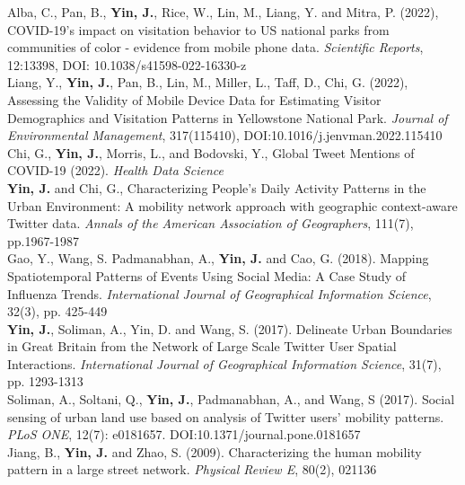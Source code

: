 \documentclass[11pt, a4paper]{article}
\newcommand{\years}[1]{\marginnote{\scriptsize #1}}
\begin{document}
\years{2022}Alba, C., Pan, B., \textbf{Yin, J.},  Rice, W., Lin, M.,  Liang, Y. and Mitra, P. (2022), COVID-19's impact on visitation behavior to US national parks from communities of color - evidence from mobile phone data. \textit{Scientific Reports}, 12:13398, DOI: 10.1038/s41598-022-16330-z\\
\years{2022}Liang, Y., \textbf{Yin, J.},  Pan, B.,  Lin, M., Miller, L., Taff, D., Chi, G. (2022), Assessing the Validity of Mobile Device Data for Estimating Visitor Demographics and Visitation Patterns in Yellowstone National Park. \textit{Journal of Environmental Management}, 317(115410), DOI:10.1016/j.jenvman.2022.115410\\
\years{2022}Chi, G., \textbf{Yin, J.}, Morris, L., and Bodovski, Y., Global Tweet Mentions of COVID-19 (2022). \textit{Health Data Science}\\
\years{2021}\textbf{Yin, J.} and  Chi, G., Characterizing People’s Daily Activity Patterns in the Urban Environment: A mobility network approach with geographic context-aware Twitter data. \textit{Annals of the American Association of Geographers}, 111(7), pp.1967-1987\\
\years{2018}Gao, Y., Wang, S. Padmanabhan, A., \textbf{Yin, J.} and Cao, G. (2018). Mapping Spatiotemporal Patterns of Events Using Social Media: A Case Study of Influenza Trends. \textit{International Journal of Geographical Information Science}, 32(3), pp. 425-449\\
\years{2017}\textbf{Yin, J.}, Soliman, A., Yin, D. and Wang, S. (2017). Delineate Urban Boundaries in Great Britain from the Network of Large Scale Twitter User Spatial Interactions. \textit{International Journal of Geographical Information Science}, 31(7), pp. 1293-1313\\
\years{2017}Soliman, A., Soltani, Q., \textbf{Yin, J.}, Padmanabhan, A., and Wang, S (2017). Social sensing of urban land use based on analysis of Twitter users' mobility patterns. \textit{PLoS ONE}, 12(7): e0181657. DOI:10.1371/journal.pone.0181657\\
\years{2009}Jiang, B., \textbf{Yin, J.} and Zhao, S. (2009). Characterizing the human mobility pattern in a large street network. \textit{Physical Review E}, 80(2), 021136
\end{document}
